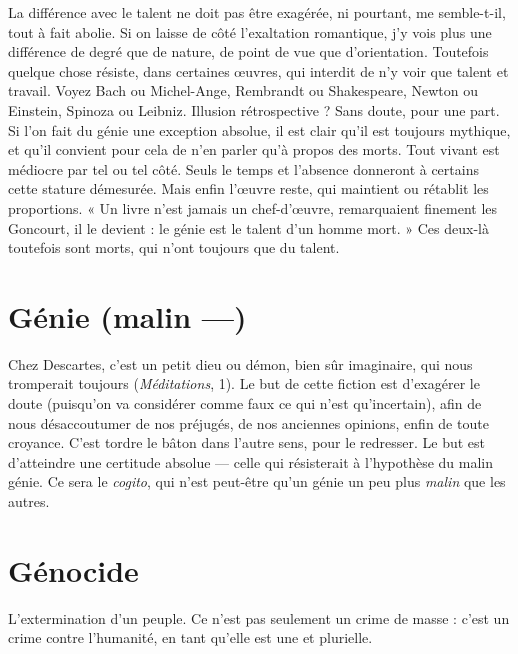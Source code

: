 La différence avec le talent ne doit pas être exagérée, ni pourtant, me
semble-t-il, tout à fait abolie. Si on laisse de côté l’exaltation romantique, j'y
vois plus une différence de degré que de nature, de point de vue que d’orientation.
Toutefois quelque chose résiste, dans certaines œuvres, qui interdit de n’y
voir que talent et travail. Voyez Bach ou Michel-Ange, Rembrandt ou Shakespeare,
Newton ou Einstein, Spinoza ou Leibniz. Illusion rétrospective ? Sans
doute, pour une part. Si l’on fait du génie une exception absolue, il est clair
qu’il est toujours mythique, et qu'il convient pour cela de n’en parler qu'à
propos des morts. Tout vivant est médiocre par tel ou tel côté. Seuls le temps
et l’absence donneront à certains cette stature démesurée. Mais enfin l’œuvre
reste, qui maintient ou rétablit les proportions. « Un livre n’est jamais un chef-d'œuvre,
remarquaient finement les Goncourt, il le devient : le génie est le
talent d’un homme mort. » Ces deux-là toutefois sont morts, qui n’ont toujours
que du talent.

\section{Génie (malin —)}
Chez Descartes, c’est un petit dieu ou démon, bien sûr
imaginaire, qui nous tromperait toujours ({\it Méditations}, 1).
Le but de cette fiction est d’exagérer le doute (puisqu’on va considérer comme
faux ce qui n’est qu’incertain), afin de nous désaccoutumer de nos préjugés, de
nos anciennes opinions, enfin de toute croyance. C’est tordre le bâton dans
l’autre sens, pour le redresser. Le but est d’atteindre une certitude absolue —
celle qui résisterait à l'hypothèse du malin génie. Ce sera le {\it cogito}, qui n’est
peut-être qu’un génie un peu plus {\it malin} que les autres.

\section{Génocide}
L’extermination d’un peuple. Ce n’est pas seulement un crime
de masse : c’est un crime contre l'humanité, en tant qu’elle est
une et plurielle.

